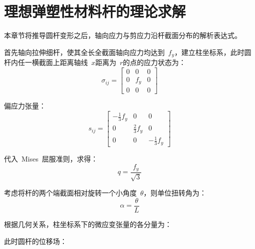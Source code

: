 \chapter{理想弹塑性材料杆的理论求解}
\label{cha:ideal_theory}
本章节将推导圆杆变形之后，轴向应力与剪应力沿杆截面分布的解析表达式。

首先轴向拉伸细杆，使其全长全截面轴向应力均达到~{$f_y$}，建立柱坐标系，此时圆杆内任一横截面上距离轴线~{$x$}距离为~{$r$}的点的应力状态为：
\begin{equation}\label{eq4}
    \sigma_{ij} = \begin{bmatrix}
        0 & 0 & 0 \\
        0 & f_y & 0 \\
        0 & 0 & 0
        \end{bmatrix}
\end{equation} 

偏应力张量：
\begin{equation}\label{eq5}
    s_{ij} = \begin{bmatrix}
        -\frac{1}{3}f_y & 0 & 0 \\
        0 & \frac{2}{3}f_y & 0 \\
        0 & 0 & -\frac{1}{3}f_y
        \end{bmatrix}
\end{equation} 

代入~Mises~屈服准则，求得：
\begin{equation}\label{eq6}
    q = \frac{f_y}{\sqrt{3}}
\end{equation} 

考虑将杆的两个端截面相对旋转一个小角度~{$\theta$}，则单位扭转角为：
\begin{equation}\label{eq7}
    \alpha  = \frac{\theta }{L}
\end{equation} 

根据几何关系，柱坐标系下的微应变张量的各分量为：


此时圆杆的位移场：